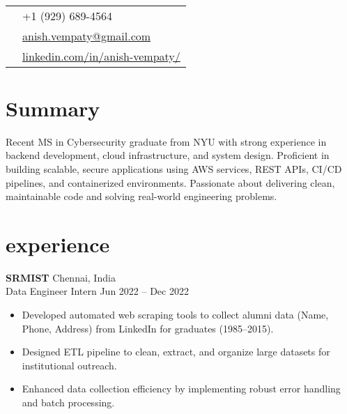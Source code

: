 \documentclass[12pt]{article}
\newcommand{\heading}[2]{\centering{\sffamily\Huge #1}\\\smallskip{\large{#2}}}
\newcommand{\entry}[4]{{{\textbf{#1}}} \hfill #3 \\ #2 \hfill #4}
\begin{document}
	
	
	\begin{paracol}{2}
		
		\heading{Anish Vempaty}{}
		
		\switchcolumn
		
		\vspace{0.01\textheight}
		\begin{adjustwidth}{-31pt}{0pt}
		\begin{supertabular}{ll}
			\footnotesize\faPhone & +1 (929) 689-4564 \\
			\footnotesize\faEnvelope & \href{mailto:anish.vempaty@gmail.com}{anish.vempaty@gmail.com} \\
			\footnotesize\faLinkedin & \href{https://www.linkedin.com/in/anish-vempaty/}{linkedin.com/in/anish-vempaty/} \\
		\end{supertabular}
		\end{adjustwidth}
		
		\bigskip
		\switchcolumn*
		\vspace{-36pt}
		\section{Summary}
		\begin{flushleft}	
			Recent MS in Cybersecurity graduate from NYU with strong experience in backend development, cloud infrastructure, and system design. Proficient in building scalable, secure applications using AWS services, REST APIs, CI/CD pipelines, and containerized environments. Passionate about delivering clean, maintainable code and solving real-world engineering problems.
			\vspace{-16pt}
		\end{flushleft}
		\section{experience}
		
		\entry{SRMIST}{Data Engineer Intern}{Chennai, India}{Jun 2022 -- Dec 2022}
		\begin{itemize}[noitemsep,leftmargin=3.5mm,rightmargin=0mm,topsep=6pt]
			\item Developed automated web scraping tools to collect alumni data (Name, Phone, Address) from LinkedIn for graduates (1985–2015).
			\item Designed ETL pipeline to clean, extract, and organize large datasets for institutional outreach.
			\item Enhanced data collection efficiency by implementing robust error handling and batch processing.
		\end{itemize}
		\medskip
		\vspace{-20pt}
		

\end{paracol}
\end{document}
